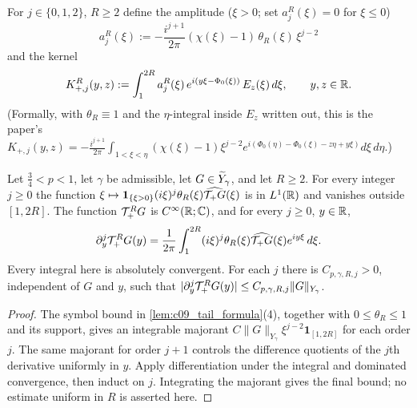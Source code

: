 \begin{definition}
  \label{def:c09_positive_kernel}
  For $j\in\{0,1,2\}$, $R\ge2$ define the amplitude ($\xi>0$; set $a_j^R(\xi)=0$ for $\xi\le0$)
  \[
    a_j^R(\xi):=-\frac{i^{j+1}}{2\pi}(\chi(\xi)-1)\,\theta_R(\xi)\,\xi^{j-2}
  \]
  and the kernel
  \[
    K_{+,j}^R(y,z):=\int_1^{2R}a_j^R(\xi)\,e^{i(y\xi-\Phi_0(\xi))}\,E_z(\xi)\,d\xi,\qquad y,z\in\mathbb{R} .
  \]
  (Formally, with $\theta_R\equiv1$ and the $\eta$-integral inside $E_z$ written out, this is the paper's
  $K_{+,j}(y,z)=-\frac{i^{j+1}}{2\pi}\int_{1<\xi<\eta}(\chi(\xi)-1)\xi^{j-2}e^{i(\Phi_0(\eta)-\Phi_0(\xi)-z\eta+y\xi)}d\xi\,d\eta$.)
\end{definition}

\begin{lemma}
  \label{lem:c09_truncated_smooth}
  Let $\frac34<p<1$, let $\gamma$ be admissible, let $G\in\widetilde{Y}_\gamma$, and let $R\ge2$.
  For every integer $j\ge0$ the function
  $\xi\mapsto\mathbf1_{\{\xi>0\}}(i\xi)^j\theta_R(\xi)\widehat{\mathcal{T}_+G}(\xi)$ is in $L^1(\mathbb{R})$
  and vanishes outside $[1,2R]$. The function $\mathcal{T}_+^RG$ is $C^\infty(\mathbb{R};\mathbb{C})$, and for every $j\ge0$, $y\in\mathbb{R}$,
  \[
    \partial_y^j\mathcal{T}_+^RG(y)=\frac1{2\pi}\int_1^{2R}
      (i\xi)^j\theta_R(\xi)\widehat{\mathcal{T}_+G}(\xi)e^{iy\xi}\,d\xi .
  \]
  Every integral here is absolutely convergent. For each $j$ there is $C_{p,\gamma,R,j}>0$,
  independent of $G$ and $y$, such that $|\partial_y^j\mathcal{T}_+^RG(y)|\le C_{p,\gamma,R,j}\|G\|_{Y_\gamma}$.
\end{lemma}
\begin{proof}
  The symbol bound in \cref{lem:c09_tail_formula}(4), together with $0\le\theta_R\le1$ and its support,
  gives an integrable majorant $C\|G\|_{Y_\gamma}\xi^{j-2}\mathbf1_{[1,2R]}$ for each order $j$.
  The same majorant for order $j+1$ controls the difference quotients of the $j$th derivative uniformly
  in $y$. Apply differentiation under the integral and dominated convergence, then induct on $j$.
  Integrating the majorant gives the final bound; no estimate uniform in $R$ is asserted here.
\end{proof}

